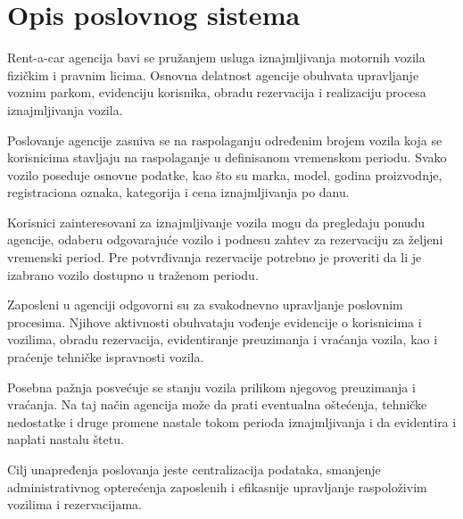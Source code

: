 
\section{Opis poslovnog sistema}

Rent-a-car agencija bavi se pružanjem usluga iznajmljivanja
motornih vozila fizičkim i pravnim licima. Osnovna delatnost
agencije obuhvata upravljanje voznim parkom, evidenciju
korisnika, obradu rezervacija i realizaciju procesa
iznajmljivanja vozila.

Poslovanje agencije zasniva se na raspolaganju određenim
brojem vozila koja se korisnicima stavljaju na raspolaganje
u definisanom vremenskom periodu. Svako vozilo poseduje
osnovne podatke, kao što su marka, model, godina proizvodnje,
registraciona oznaka, kategorija i cena iznajmljivanja po danu.

Korisnici zainteresovani za iznajmljivanje vozila mogu da
pregledaju ponudu agencije, odaberu odgovarajuće vozilo i
podnesu zahtev za rezervaciju za željeni vremenski period.
Pre potvrđivanja rezervacije potrebno je proveriti da li je
izabrano vozilo dostupno u traženom periodu.

Zaposleni u agenciji odgovorni su za svakodnevno upravljanje
poslovnim procesima. Njihove aktivnosti obuhvataju vođenje
evidencije o korisnicima i vozilima, obradu rezervacija,
evidentiranje preuzimanja i vraćanja vozila, kao i praćenje
tehničke ispravnosti vozila.

Posebna pažnja posvećuje se stanju vozila prilikom njegovog
preuzimanja i vraćanja. Na taj način agencija može da prati
eventualna oštećenja, tehničke nedostatke i druge promene
nastale tokom perioda iznajmljivanja i da evidentira i naplati
nastalu štetu.

Cilj unapređenja poslovanja jeste centralizacija podataka,
smanjenje administrativnog opterećenja zaposlenih i
efikasnije upravljanje raspoloživim vozilima i rezervacijama.
